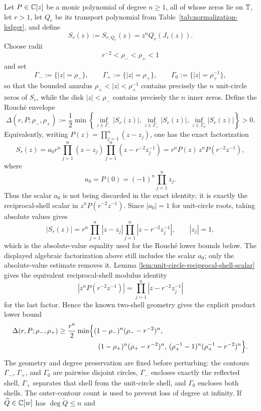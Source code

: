 \begin{theorem}\label{thm:quantitative-annular-rouche-stability}
Let \(P\in\mathbb{C}[z]\) be a monic polynomial of degree \(n\ge1\), all of whose zeros lie on \(\mathbb{T}\), let \(r>1\), let \(Q_r\) be its transport polynomial from Table~\ref{tab:normalization-ledger}, and define
\[
S_r(z):=S_{r,Q_r}(z)=z^nQ_r(J_r(z)).
\]
Choose radii
\[
r^{-2}<\rho_-<\rho_+<1
\]
and set
\[
\Gamma_-:=\{|z|=\rho_-\},\qquad
\Gamma_+:=\{|z|=\rho_+\},\qquad
\Gamma_0:=\{|z|=\rho_+^{-1}\},
\]
so that the bounded annulus \(\rho_+<|z|<\rho_+^{-1}\) contains precisely the \(n\) unit-circle zeros of \(S_r\), while the disk \(|z|<\rho_-\) contains precisely the \(n\) inner zeros.  Define the Rouch\'e envelope
\[
\Delta(r,P;\rho_-,\rho_+):=\frac12\min\left\{
\inf_{z\in\Gamma_-}|S_r(z)|,
\inf_{z\in\Gamma_+}|S_r(z)|,
\inf_{z\in\Gamma_0}|S_r(z)|
\right\}>0.
\]
Equivalently, writing \(P(z)=\prod_{j=1}^{n}(z-z_j)\), one has the
exact factorization
\[
S_r(z)
=a_0r^n\prod_{j=1}^{n}(z-z_j)
\prod_{j=1}^{n}(z-r^{-2}z_j^{-1})
=r^nP(z)\,z^nP(r^{-2}z^{-1}),
\]
where
\[
a_0=P(0)=(-1)^n\prod_{j=1}^{n}z_j .
\]
Thus the scalar \(a_0\) is not being discarded in the exact identity; it
is exactly the reciprocal-shell scalar in \(z^nP(r^{-2}z^{-1})\).
Since \(|a_0|=1\) for unit-circle roots, taking absolute values gives
\[
|S_r(z)|=r^n\prod_{j=1}^{n}|z-z_j|
\prod_{j=1}^{n}|z-r^{-2}z_j^{-1}|,
\qquad |z_j|=1,
\]
which is the absolute-value equality used for the Rouch\'e lower bounds below.  The
displayed algebraic factorization above still includes the scalar
\(a_0\); only the absolute-value estimate removes it.  Lemma
\ref{lem:unit-circle-reciprocal-shell-scalar} gives the
equivalent reciprocal-shell modulus identity
\[
\left|z^nP(r^{-2}z^{-1})\right|
=\prod_{j=1}^{n}|z-r^{-2}z_j^{-1}|
\]
for the last factor.  Hence the known two-shell geometry gives the
explicit product lower bound
\[
\begin{aligned}
\Delta(r,P;\rho_-,\rho_+)
&\ge
\frac{r^n}{2}\min\Bigl\{
(1-\rho_-)^n(\rho_- - r^{-2})^n,\\
&\hspace{5.7em}
(1-\rho_+)^n(\rho_+ - r^{-2})^n,\,
(\rho_+^{-1}-1)^n(\rho_+^{-1}-r^{-2})^n
\Bigr\}.
\end{aligned}
\]
The geometry and degree preservation are fixed before perturbing: the contours \(\Gamma_-\), \(\Gamma_+\), and \(\Gamma_0\) are pairwise disjoint circles, \(\Gamma_-\) encloses exactly the reflected shell, \(\Gamma_+\) separates that shell from the unit-circle shell, and \(\Gamma_0\) encloses both shells.  The outer-contour count is used to prevent loss of degree at infinity.  If \(\widetilde Q\in\mathbb{C}[w]\) has \(\deg \widetilde Q\le n\) and

\end{theorem}
